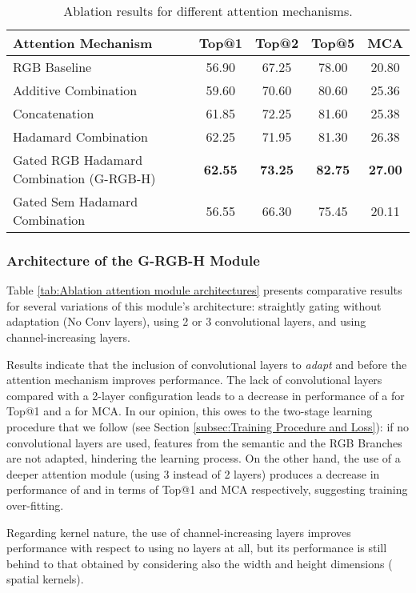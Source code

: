 \documentclass[review, 3p, sort&compress]{elsarticle}
\begin{document}
\begin{table}[t!]
    \begin{centering}
    \renewcommand{\arraystretch}{1.2}
    \footnotesize
    \begin{tabular}{lcccc}
        \hline 
        Attention Mechanism & Top@1 & Top@2 & Top@5 & MCA\tabularnewline
        \hline 
        RGB Baseline &  56.90 & 67.25 & 78.00 & 20.80\tabularnewline
        Additive Combination &  59.60 & 70.60 & 80.60 & 25.36\tabularnewline
        Concatenation & 61.85 & 72.25 & 81.60 & 25.38\tabularnewline
        Hadamard Combination & 62.25 & 71.95 & 81.30 & 26.38\tabularnewline
        Gated RGB Hadamard Combination (G-RGB-H) & \textbf{62.55} & \textbf{73.25} & \textbf{82.75} & \textbf{27.00}\tabularnewline
        \hline 
        Gated Sem Hadamard Combination & 56.55 & 66.30 & 75.45 & 20.11\tabularnewline
        \hline 
    \end{tabular}
    \caption{Ablation results for different attention mechanisms.}
    \label{tab:Attention Mechanisms}
    \par
    \end{centering}
\end{table}

\subsubsection*{Architecture of the G-RGB-H Module}
Table \ref{tab:Ablation attention module architectures} presents comparative results for several variations of this module's architecture: straightly gating without adaptation (No Conv layers), using 2 or 3 convolutional layers, and using  channel-increasing layers.

Results indicate that the inclusion of convolutional layers to \textit{adapt}  and  before the attention mechanism improves performance. The lack of convolutional layers compared with a 2-layer configuration leads to a decrease in performance of a  for Top@1 and a  for MCA. In our opinion, this owes to the two-stage learning procedure that we follow (see Section \ref{subsec:Training Procedure and Loss}): if no convolutional layers are used, features from the semantic and the RGB Branches are not adapted, hindering the learning process. On the other hand, the use of a deeper attention module (using 3 instead of 2 layers) produces a decrease in performance of  and  in terms of Top@1 and MCA respectively, suggesting training over-fitting. 

Regarding kernel nature, the use of  channel-increasing layers improves performance with respect to using no layers at all, but its performance is still behind to that obtained by considering also the width and height dimensions ( spatial kernels). 
\end{document}
